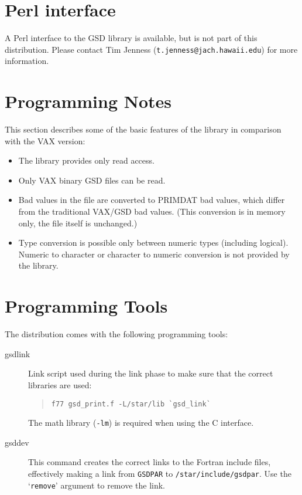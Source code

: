 \documentclass[twoside,11pt]{article}
\renewcommand{\_}{\texttt{\symbol{95}}}
\begin{document}
\section{Perl interface}

A Perl interface to the GSD library is available, but is not part of this
distribution. Please contact Tim Jenness (\texttt{t.jenness@jach.hawaii.edu})
for more information.

\section{Programming Notes}

This section describes some of the basic features of the library in
comparison with the VAX version:

\begin{itemize}
\item The library provides only read access.

\item Only VAX binary GSD files can be read.

\item Bad values in the file are converted to PRIMDAT bad
values\cite{primdat}, which differ from the traditional VAX/GSD bad
values. (This conversion is in memory only, the file itself is unchanged.)

\item Type conversion is possible only between numeric types (including
logical). Numeric to character or character to numeric conversion is not
provided by the library.

\end{itemize}

\section{Programming Tools}

The distribution comes with the following programming tools:

\begin{description}
\item[gsd\_link] \mbox{}

Link script used during the link phase to make sure that the correct
libraries are used:
\begin{quote}
\begin{verbatim}
f77 gsd_print.f -L/star/lib `gsd_link`
\end{verbatim}
\end{quote}

The math library (\texttt{-lm}) is required when using the C interface.

\item[gsd\_dev] \mbox{}

This command creates the correct links to the Fortran include files,
effectively making a link from \texttt{GSD\_PAR} to
\texttt{/star/include/gsd\_par}. 
Use the `\texttt{remove}' argument to remove the link.

\end{description}
\end{document}
